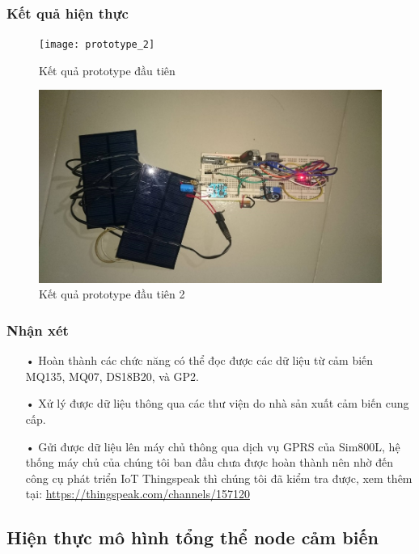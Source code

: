 \subsubsection*{Kết quả hiện thực}
\begin{figure}[H]
\centering    
\texttt{[image: prototype\_2]}
\caption[Kết quả prototype đầu tiên]{Kết quả prototype đầu tiên}
\label{fig:prototype_2}
\end{figure}

\begin{figure}[H]
\centering    
\includegraphics[width=5in]{prototype_3}
\caption[Kết quả prototype đầu tiên 2]{Kết quả prototype đầu tiên 2}
\label{fig:prototype_3}
\end{figure}
\subsubsection*{Nhận xét}
\begin{itemize}
\item[•] Hoàn thành các chức năng có thể đọc được các dữ liệu từ cảm biến MQ135, MQ07, DS18B20, và GP2.
\item[•] Xử lý được dữ liệu thông qua các thư viện do nhà sản xuất cảm biến cung cấp.
\item[•] Gửi được dữ liệu lên máy chủ thông qua dịch vụ GPRS của Sim800L, hệ thống máy chủ của chúng tôi ban đầu chưa được hoàn thành nên nhờ đến công cụ phát triển IoT Thingspeak thì chúng tôi đã kiểm tra được, xem thêm tại: \url{https://thingspeak.com/channels/157120}
\end{itemize}




\subsection{Hiện thực mô hình tổng thể node cảm biến}
